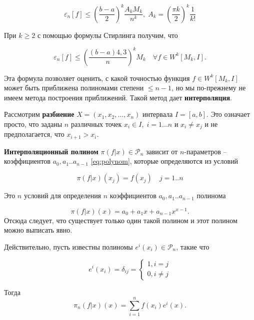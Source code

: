 \begin{equation}
\varepsilon_n[f] \leq \left(\frac{b-a}{2}\right)^k \frac{A_k M_k}{n^k},\; A_k = \left(\frac{\pi k}{2}\right) ^k \frac{1}{k!}
\end{equation}

При $k \geq 2$ с помощью формулы Стирлинга получим, что 

\begin{equation}
\varepsilon_n[f] \leq \left(\frac{(b-a)4,3}{n}\right)^k M_k \quad \forall f \in W^k[M_k, I].
\end{equation}

Эта формула позволяет оценить, с какой точностью функция $f \in W^k[M_k, I]$ может быть приближена полиномами степени $\leq n-1$, но мы по-прежнему не имеем метода построения приближений.
Такой метод дает \textbf{интерполяция}.

Рассмотрим \textbf{разбиение} $X = (x_1, x_2,..., x_n)$ интервала $I = [a, b]$. Это означает просто, что заданы $n$ различных точек $x_i \in I, \; i = 1 ... n$ и $x_i \neq x_j$ и не предполагается, что $x_{i+1} > x_i$.

\textbf{Интерполяционный полином} $\pi(f|x) \in \mathscr{P}_n $ зависит от $n$-параметров -- коэффициентов $a_0, a_1 .. a_{n-1}$ \ref{eq:polynom}, которые определяются из условий

\begin{equation}\label{eq:interpolation}
\pi(f|x)(x_j) = f(x_j) \quad j = 1 .. n
\end{equation}

Это $n$ условий для определения $n$ коэффициентов  $a_0, a_1 .. a_{n-1}$ полинома

\begin{equation}
\pi(f|x)(x) = a_0 + a_1x + a_{n-1}x^{x-1}.
\end{equation}
Отсюда следует, что существует только один такой полином и этот полином можно выписать явно. 

Действительно, пусть известны полиномы $e^i(x_i) \in \mathscr{P}_n $, такие что

\begin{equation}
e^i(x_i)= \delta_{ij} =
\begin{cases}
1, i = j \\
0, i \neq j

\end{cases}
\end{equation}

Тогда 
\begin{equation} \label{eq:2.19}
\pi_n(f|x)(x) = \sum_{i = 1}^{n} f(x_i)e^i(x).
\end{equation}

